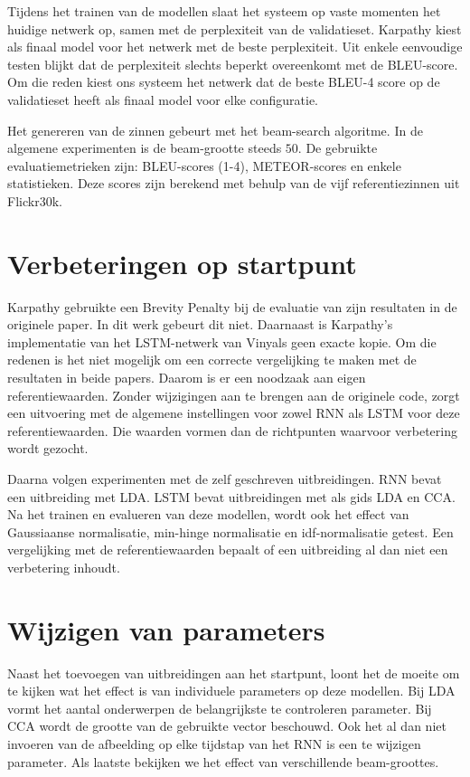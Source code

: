 Tijdens het trainen van de modellen slaat het systeem op vaste momenten het huidige netwerk op, samen met de perplexiteit van de validatieset. Karpathy kiest als finaal model voor het netwerk met de beste perplexiteit. Uit enkele eenvoudige testen blijkt dat de perplexiteit slechts beperkt overeenkomt met de BLEU-score. Om die reden kiest ons systeem het netwerk dat de beste BLEU-4 score op de validatieset heeft als finaal model voor elke configuratie.

Het genereren van de zinnen gebeurt met het beam-search algoritme. In de algemene experimenten is de beam-grootte steeds $50$.
De gebruikte evaluatiemetrieken zijn: BLEU-scores (1-4), METEOR-scores en enkele statistieken. Deze scores zijn berekend met behulp van de vijf referentiezinnen uit Flickr30k.

\section{Verbeteringen op startpunt}
Karpathy gebruikte een Brevity Penalty bij de evaluatie van zijn resultaten in de originele paper. In dit werk gebeurt dit niet. Daarnaast is Karpathy's implementatie van het LSTM-netwerk van Vinyals geen exacte kopie. Om die redenen is het niet mogelijk om een correcte vergelijking te maken met de resultaten in beide papers. Daarom is er een noodzaak aan eigen referentiewaarden. Zonder wijzigingen aan te brengen aan de originele code, zorgt een uitvoering met de algemene instellingen voor zowel RNN als LSTM voor deze referentiewaarden. Die waarden vormen dan de richtpunten waarvoor verbetering wordt gezocht.

Daarna volgen experimenten met de zelf geschreven uitbreidingen. RNN bevat een uitbreiding met LDA. LSTM bevat uitbreidingen met als gids LDA en CCA.
Na het trainen en evalueren van deze modellen, wordt ook het effect van Gaussiaanse normalisatie, min-hinge normalisatie en idf-normalisatie getest.
Een vergelijking met de referentiewaarden bepaalt of een uitbreiding al dan niet een verbetering inhoudt.

\section{Wijzigen van parameters}
Naast het toevoegen van uitbreidingen aan het startpunt, loont het de moeite om te kijken wat het effect is van individuele parameters op deze modellen. Bij LDA vormt het aantal onderwerpen de belangrijkste te controleren parameter. Bij CCA wordt de grootte van de gebruikte vector beschouwd. Ook het al dan niet invoeren van de afbeelding op elke tijdstap van het RNN is een te wijzigen parameter. Als laatste bekijken we het effect van verschillende beam-groottes.

